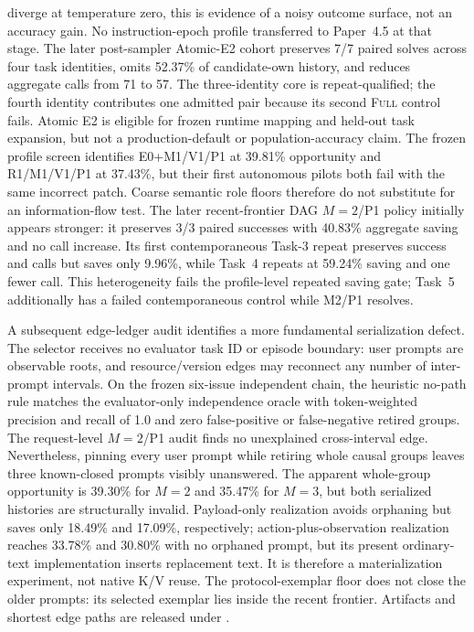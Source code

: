 \documentclass[11pt]{article}
\begin{document}
diverge at temperature zero, this is evidence of a noisy outcome surface, not
an accuracy gain.  No instruction-epoch profile transferred to Paper~4.5 at
that stage.  The later post-sampler Atomic-E2 cohort preserves 7/7 paired
solves across four task identities, omits 52.37\% of candidate-own history,
and reduces aggregate calls from 71 to 57.  The three-identity core is
repeat-qualified; the fourth identity contributes one admitted pair because
its second \textsc{Full} control fails.  Atomic E2 is eligible for frozen
runtime mapping and held-out task expansion, but not a production-default or
population-accuracy claim.
The frozen profile screen identifies E0+M1/V1/P1 at 39.81\% opportunity and
R1/M1/V1/P1 at 37.43\%, but their first autonomous pilots both fail with the
same incorrect patch.  Coarse semantic role floors therefore do not substitute
for an information-flow test.  The later recent-frontier DAG $M=2$/P1 policy
initially appears stronger: it preserves 3/3 paired successes with 40.83\%
aggregate saving and no call increase.  Its first contemporaneous Task-3
repeat preserves success and calls but saves only 9.96\%, while Task~4 repeats
at 59.24\% saving and one fewer call.  This heterogeneity fails the
profile-level repeated saving gate; Task~5 additionally has a failed
contemporaneous control while M2/P1 resolves.

A subsequent edge-ledger audit identifies a more fundamental serialization
defect.  The selector receives no evaluator task ID or episode boundary: user
prompts are observable roots, and resource/version edges may reconnect any
number of inter-prompt intervals.  On the frozen six-issue independent chain,
the heuristic no-path rule matches the evaluator-only independence oracle with
token-weighted precision and recall of 1.0 and zero false-positive or
false-negative retired groups.  The request-level $M=2$/P1 audit finds no
unexplained cross-interval edge.  Nevertheless, pinning every user prompt while
retiring whole causal groups leaves three known-closed prompts visibly
unanswered.  The apparent whole-group opportunity is 39.30\% for $M=2$ and
35.47\% for $M=3$, but both serialized histories are structurally invalid.
Payload-only realization avoids orphaning but saves only 18.49\% and 17.09\%,
respectively; action-plus-observation realization reaches 33.78\% and 30.80\%
with no orphaned prompt, but its present ordinary-text implementation inserts
replacement text.  It is therefore a materialization experiment, not native
K/V reuse.  The protocol-exemplar floor does not close the older prompts: its
selected exemplar lies inside the recent frontier.  Artifacts and shortest
edge paths are released under
.
\end{document}
